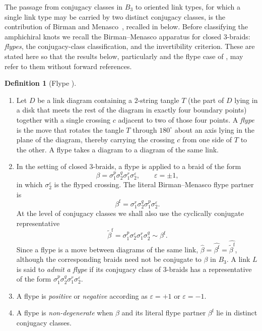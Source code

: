 \documentclass[11pt]{article}
\theoremstyle{definition}
\newtheorem{definition}[definition]{Definition}
\begin{document}
\noindent The passage from conjugacy classes in $B_3$ to oriented link types, for which
a single link type may be carried by two distinct conjugacy classes, is the
contribution of Birman and Menasco~\cite{BM1993}, recalled in
 below. Before classifying the amphichiral knots we recall the Birman--Menasco
apparatus for closed $3$-braids: \emph{flypes}, the conjugacy-class classification, and the
invertibility criterion. These are stated here so that the results below, particularly
 and the flype case of , may refer
to them without forward references.

\begin{definition}[Flype {\cite{BM2008}}]\label{def:flype}
\leavevmode
\begin{enumerate}[label=\textup{(\alph*)}]
\item Let $D$ be a link diagram containing a $2$-string tangle $T$ (the part of
$D$ lying in a disk that meets the rest of the diagram in exactly four boundary
points) together with a single crossing $c$ adjacent to two of those four points.
A \emph{flype} is the move that rotates the tangle $T$ through $180^{\circ}$ about
an axis lying in the plane of the diagram, thereby carrying the crossing $c$ from
one side of $T$ to the other. A flype takes a diagram to a diagram of the same
link. 

\item In the setting of closed $3$-braids, a flype is applied to a braid of the
form
\[
\beta=\sigma_{1}^{p}\sigma_{2}^{q}\sigma_{1}^{r}\sigma_{2}^{\varepsilon},
\qquad \varepsilon=\pm1,
\]
in which $\sigma_{2}^{\varepsilon}$ is the flyped crossing. The literal
Birman--Menasco flype partner is
\[
\beta^{\mathrm f}
=\sigma_{1}^{r}\sigma_{2}^{q}\sigma_{1}^{p}\sigma_{2}^{\varepsilon}.
\]
At the level of conjugacy classes we shall also use the cyclically conjugate
representative
\[
\widetilde\beta^{\mathrm f}
=\sigma_{1}^{p}\sigma_{2}^{\varepsilon}\sigma_{1}^{r}\sigma_{2}^{q}
\sim\beta^{\mathrm f}.
\]
Since a flype is a move between diagrams of the same link,
$\widehat{\beta}=\widehat{\beta^{\mathrm f}}=
\widehat{\widetilde\beta^{\mathrm f}}$, although the corresponding braids need
not be conjugate to $\beta$ in $B_3$.
A link $L$ is said to \emph{admit a flype} if its conjugacy class of $3$-braids
has a representative of the form
$\sigma_{1}^{p}\sigma_{2}^{q}\sigma_{1}^{r}\sigma_{2}^{\varepsilon}$.
\item A flype is \emph{positive} or \emph{negative} according as
$\varepsilon=+1$ or $\varepsilon=-1$.
\item A flype is \emph{non-degenerate} when $\beta$ and its literal flype
partner $\beta^{\mathrm f}$
lie in distinct conjugacy classes.
\end{enumerate}
\end{definition}
\end{document}
